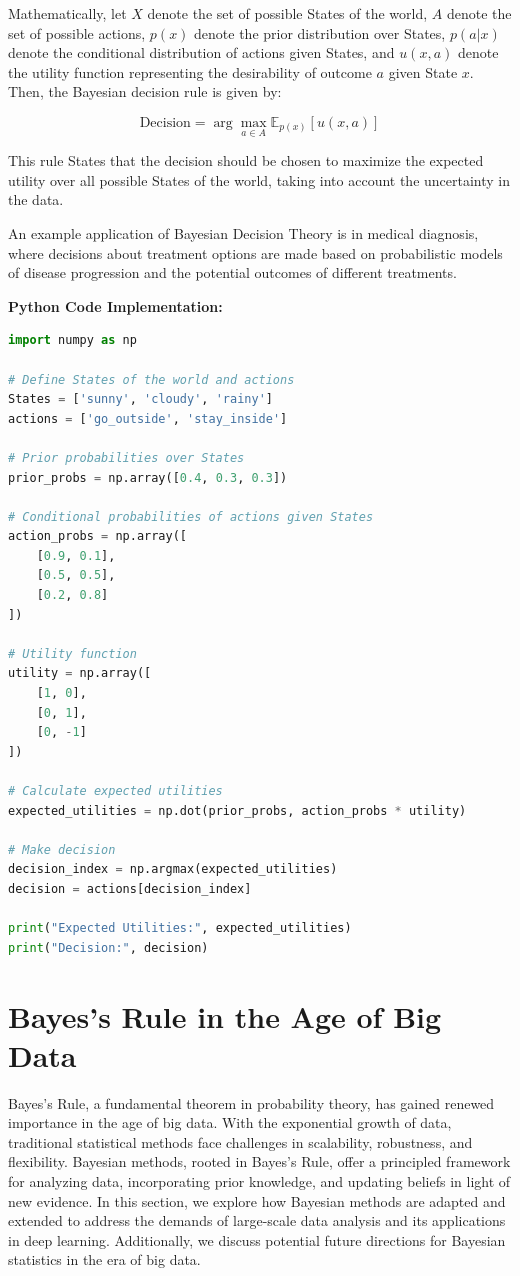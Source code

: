 \documentclass[12pt]{book} %
\begin{document}
Mathematically, let $ X $ denote the set of possible States of the world, $ A $ denote the set of possible actions, $ p(x) $ denote the prior distribution over States, $ p(a|x) $ denote the conditional distribution of actions given States, and $ u(x,a) $ denote the utility function representing the desirability of outcome $ a $ given State $ x $. Then, the Bayesian decision rule is given by:

\[ \text{Decision} = \arg\max_{a \in A} \mathbb{E}_{p(x)}[u(x,a)] \]

This rule States that the decision should be chosen to maximize the expected utility over all possible States of the world, taking into account the uncertainty in the data.

An example application of Bayesian Decision Theory is in medical diagnosis, where decisions about treatment options are made based on probabilistic models of disease progression and the potential outcomes of different treatments.

\textbf{Python Code Implementation:}
\FloatBarrier
\begin{lstlisting}[language=Python, caption=Python Implementation of Bayesian Decision Theory]
import numpy as np

# Define States of the world and actions
States = ['sunny', 'cloudy', 'rainy']
actions = ['go_outside', 'stay_inside']

# Prior probabilities over States
prior_probs = np.array([0.4, 0.3, 0.3])

# Conditional probabilities of actions given States
action_probs = np.array([
    [0.9, 0.1],
    [0.5, 0.5],
    [0.2, 0.8]
])

# Utility function
utility = np.array([
    [1, 0],
    [0, 1],
    [0, -1]
])

# Calculate expected utilities
expected_utilities = np.dot(prior_probs, action_probs * utility)

# Make decision
decision_index = np.argmax(expected_utilities)
decision = actions[decision_index]

print("Expected Utilities:", expected_utilities)
print("Decision:", decision)
\end{lstlisting}


\section{Bayes's Rule in the Age of Big Data}
Bayes's Rule, a fundamental theorem in probability theory, has gained renewed importance in the age of big data. With the exponential growth of data, traditional statistical methods face challenges in scalability, robustness, and flexibility. Bayesian methods, rooted in Bayes's Rule, offer a principled framework for analyzing data, incorporating prior knowledge, and updating beliefs in light of new evidence. In this section, we explore how Bayesian methods are adapted and extended to address the demands of large-scale data analysis and its applications in deep learning. Additionally, we discuss potential future directions for Bayesian statistics in the era of big data.
\end{document}

